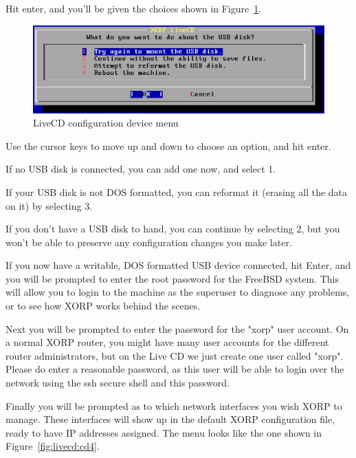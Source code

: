 Hit enter, and you'll be given the choices shown in
Figure~\ref{fig:livecd:cd2}.

\begin{figure}[h]
  \begin{center}
    \includegraphics[width=6.0in]{figs/cd2}
    \caption{LiveCD configuration device menu}
    \label{fig:livecd:cd2}
  \end{center}
\end{figure}


Use the cursor keys to move up and down to choose an option, and hit enter.

If no USB disk is connected, you can add one now, and select 1.

If your USB disk is not DOS formatted, you can reformat it (erasing all the data
on it) by selecting 3.

If you don't have a USB disk to hand, you can continue by selecting 2,
but you won't be able to preserve any configuration changes you make
later.

If you now have a writable, DOS formatted USB device connected,
hit Enter, and you will be prompted to enter the root password for the
FreeBSD system.  This will allow you to login to the machine as the
superuser to diagnose any problems, or to see how XORP works behind
the scenes.

Next you will be prompted to enter the password for the "xorp" user
account.  On a normal XORP router, you might have many user accounts
for the different router administrators, but on the Live CD we just
create one user called "xorp".  Please do enter a reasonable password,
as this user will be able to login over the network using the ssh
secure shell and this password.

Finally you will be prompted as to which network interfaces you wish
XORP to manage.  These interfaces will show up in the default XORP
configuration file, ready to have IP addresses assigned.  The menu
looks like the one shown in Figure~\ref{fig:livecd:cd4}.

